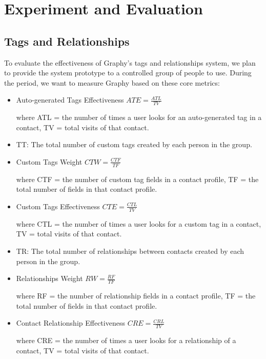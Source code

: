 \chapter{Experiment and Evaluation}
\section{Tags and Relationships}
To evaluate the effectiveness of Graphy's tags and relationships system, we plan to provide the system prototype to a controlled group of people to use. During the period, we want to measure Graphy based on these core metrics:
 
\begin{itemize}
	\item Auto-generated Tags Effectiveness $ATE = \frac{ATL}{TV}$
	
	where ATL = the number of times a user looks for an auto-generated tag in a contact, TV = total visits of that contact.
	
	\item TT: The total number of custom tags created by each person in the group.
	
	\item Custom Tags Weight $CTW = \frac{CTF}{TF}$
	
	where CTF = the number of custom tag fields in a contact profile, TF = the total number of fields in that contact profile.
	
	\item Custom Tags Effectiveness $CTE = \frac{CTL}{TV}$
	
	where CTL = the number of times a user looks for a custom tag in a contact, TV = total visits of that contact.
	
	\item TR: The total number of relationships between contacts created by each person in the group.
	
	\item Relationships Weight $RW = \frac{RF}{TF}$
		
	where RF = the number of relationship fields in a contact profile, TF = the total number of fields in that contact profile.
	
	\item Contact Relationship Effectiveness $CRE = \frac{CRL}{TV}$
	
	where CRE = the number of times a user looks for a relationship of a contact, TV = total visits of that contact.
\end{itemize}
